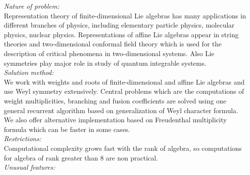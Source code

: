\documentclass[preprint,12pt]{elsarticle}
\begin{document}
\begin{small}
{\em Nature of problem:}\\
Representation theory of finite-dimensional Lie algebras has many applications in different branches of physics, including elementary particle physics, molecular physics, nuclear physics. Representations of affine Lie algebras appear in string theories and two-dimensional conformal field theory which is used for the description of critical phenomena in two-dimensional systems. Also Lie symmetries play major role in study of quantum integrable systems. 
   \\
{\em Solution method:}\\
We work with weights and roots of finite-dimensional and affine Lie algebras and use Weyl symmetry extensively. Central problems which are the computations of weight multiplicities, branching and fusion coefficients are solved using one general recurrent algorithm based on generalization of Weyl character formula. We also offer alternative implementation based on Freudenthal multiplicity formula which can be faster in some cases. 
   \\
{\em Restrictions:}\\
Computational complexity grows fast  with the rank of algebra, so computations for algebra of rank greater than 8 are non practical. 
   \\
{\em Unusual features:}\\

\end{small}
\end{document}
